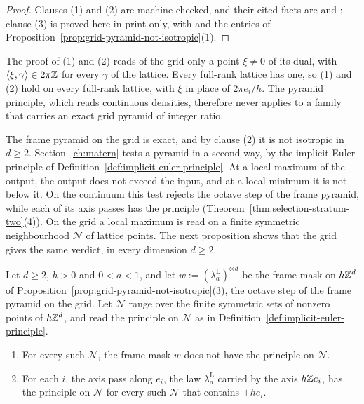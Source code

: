 \begin{proof}
Clauses (1) and (2) are machine-checked, and their cited facts are  and ;
clause (3) is proved here in print only, with  and the entries of
Proposition~\ref{prop:grid-pyramid-not-isotropic}(1).
\end{proof}

The proof of (1) and (2) reads of the grid only a point $\xi \ne 0$ of its dual, with
$\langle\xi, \gamma\rangle \in 2\pi\mathbb{Z}$ for every $\gamma$ of the lattice. Every full-rank lattice
has one, so (1) and (2) hold on every full-rank lattice, with $\xi$ in place of $2\pi e_i/h$. The
pyramid principle, which reads continuous densities, therefore never applies to a family that
carries an exact grid pyramid of integer ratio.

The frame pyramid on the grid is exact, and by clause (2) it is not isotropic in $d \ge 2$.
Section~\ref{ch:matern} tests a pyramid in a second way, by the implicit-Euler principle of
Definition~\ref{def:implicit-euler-principle}. At a local maximum of the output, the output does
not exceed the input, and at a local minimum it is not below it. On the continuum this test rejects
the octave step of the frame pyramid, while each of its axis passes has the principle
(Theorem~\ref{thm:selection-stratum-two}(4)). On the grid a local maximum is read on a finite
symmetric neighbourhood $\mathcal{N}$ of lattice points. The next proposition shows that the grid
gives the same verdict, in every dimension $d \ge 2$.

\begin{proposition}
\label{prop:grid-frame-step-not-selected}

Let $d \ge 2$, $h > 0$ and $0 < a < 1$, and let $w := (\lambda^{\mathrm L}_a)^{\otimes d}$ be the
frame mask on $h\mathbb{Z}^d$ of Proposition~\ref{prop:grid-pyramid-not-isotropic}(3), the octave step of
the frame \Matern{} pyramid on the grid. Let $\mathcal{N}$ range over the finite symmetric sets of
nonzero points of $h\mathbb{Z}^d$, and read the principle on $\mathcal{N}$ as in
Definition~\ref{def:implicit-euler-principle}.
\begin{enumerate}
\item For every such $\mathcal{N}$, the frame mask $w$ does not have the principle on $\mathcal{N}$.
\item For each $i$, the axis pass along $e_i$, the law $\lambda^{\mathrm L}_a$ carried by the axis
$h\mathbb{Z} e_i$, has the principle on $\mathcal{N}$ for every such $\mathcal{N}$ that contains $\pm he_i$.
\end{enumerate}
\end{proposition}

